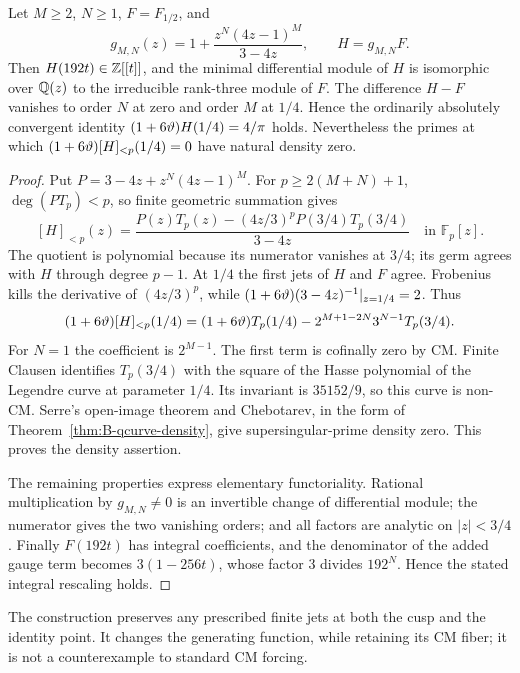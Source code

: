 \label{subsec:C-gauge-obstruction}
\begin{proposition}
\label{prop:C-finite-jet-density-zero}\label{cor:C-two-jet-density-zero}
Let $M\ge2$, $N\ge1$, $F=F_{1/2}$, and
\[
 g_{M,N}(z)=1+\frac{z^N(4z-1)^M}{3-4z},\qquad H=g_{M,N}F.
\]
Then $H(192t)\in\mathbb Z[[t]]$, and the minimal differential module of
$H$ is isomorphic over $\mathbb Q(z)$ to the irreducible rank-three module
of $F$. The difference $H-F$ vanishes to order $N$ at zero and
order $M$ at $1/4$. Hence the ordinarily absolutely convergent
identity $(1+6\vartheta)H(1/4)=4/\pi$ holds. Nevertheless the primes
at which $(1+6\vartheta)[H]_{<p}(1/4)=0$ have natural density zero.
\end{proposition}
\begin{proof}
Put $P=3-4z+z^N(4z-1)^M$. For $p\ge2(M+N)+1$,
$\deg(PT_p)<p$, so finite geometric summation gives
\begin{equation}\label{eq:C-gauge-finite}
 [H]_{<p}(z)=
 \frac{P(z)T_p(z)-(4z/3)^pP(3/4)T_p(3/4)}{3-4z}
 \quad\text{in }\mathbb F_p[z].
\end{equation}
The quotient is polynomial because its numerator vanishes at $3/4$;
its germ agrees with $H$ through degree $p-1$. At $1/4$ the first
jets of $H$ and $F$ agree. Frobenius kills the derivative of
$(4z/3)^p$, while
$(1+6\vartheta)(3-4z)^{-1}|_{z=1/4}=2$. Thus
\begin{equation}\label{eq:C-gauge-weighted}
 (1+6\vartheta)[H]_{<p}(1/4)
 =(1+6\vartheta)T_p(1/4)
       -2^{M+1-2N}3^{N-1}T_p(3/4).
\end{equation}
For $N=1$ the coefficient is $2^{M-1}$. The first term is cofinally
zero by CM. Finite Clausen identifies $T_p(3/4)$ with the square
of the Hasse polynomial of the Legendre curve at parameter $1/4$.
Its invariant is $35152/9$, so this curve is non-CM. Serre's
open-image theorem and Chebotarev, in the form of
Theorem~\ref{thm:B-qcurve-density}, give supersingular-prime density
zero. This proves the density assertion.

The remaining properties express elementary functoriality. Rational
multiplication by $g_{M,N}\ne0$ is an invertible change of differential
module; the numerator gives the two vanishing orders; and all factors
are analytic on $|z|<3/4$. Finally $F(192t)$ has integral coefficients,
and the denominator of the added gauge term becomes $3(1-256t)$,
whose factor $3$ divides $192^N$. Hence the stated integral rescaling
holds.
\end{proof}
The construction preserves any prescribed finite jets at both the
cusp and the identity point. It changes the generating function,
while retaining its CM fiber; it is not a counterexample to standard
CM forcing.


